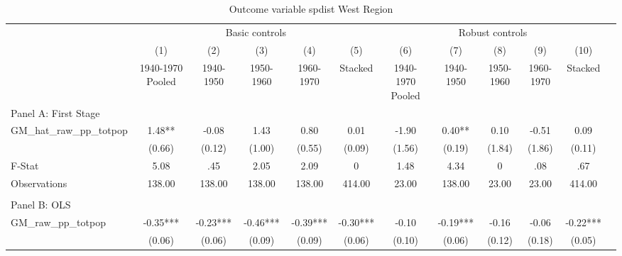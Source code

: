  \begin{table}[htbp]\centering {} \begin{threeparttable} \caption{Outcome variable spdist West Region} \begin{tabular}{l*{11}{c}} \toprule
          &\multicolumn{5}{c}{Basic controls}                                   &\multicolumn{5}{c}{Robust controls}                                  \\\cmidrule(lr){2-6}\cmidrule(lr){7-11}
          &\multicolumn{1}{c}{(1)}&\multicolumn{1}{c}{(2)}&\multicolumn{1}{c}{(3)}&\multicolumn{1}{c}{(4)}&\multicolumn{1}{c}{(5)}&\multicolumn{1}{c}{(6)}&\multicolumn{1}{c}{(7)}&\multicolumn{1}{c}{(8)}&\multicolumn{1}{c}{(9)}&\multicolumn{1}{c}{(10)}\\
          &\multicolumn{1}{c}{1940-1970 Pooled}&\multicolumn{1}{c}{1940-1950}&\multicolumn{1}{c}{1950-1960}&\multicolumn{1}{c}{1960-1970}&\multicolumn{1}{c}{Stacked}&\multicolumn{1}{c}{1940-1970 Pooled}&\multicolumn{1}{c}{1940-1950}&\multicolumn{1}{c}{1950-1960}&\multicolumn{1}{c}{1960-1970}&\multicolumn{1}{c}{Stacked}\\
\cmidrule(lr){1-11}
\multicolumn{10}{l}{Panel A: First Stage}\\
\cmidrule(lr){1-11}
GM\_hat\_raw\_pp\_totpop&      1.48** &     -0.08   &      1.43   &      0.80   &      0.01   &     -1.90   &      0.40** &      0.10   &     -0.51   &      0.09   \\
          &    (0.66)   &    (0.12)   &    (1.00)   &    (0.55)   &    (0.09)   &    (1.56)   &    (0.19)   &    (1.84)   &    (1.86)   &    (0.11)   \\
\midrule
F-Stat    &      5.08   &       .45   &      2.05   &      2.09   &         0   &      1.48   &      4.34   &         0   &       .08   &       .67   \\
Observations&    138.00   &    138.00   &    138.00   &    138.00   &    414.00   &     23.00   &    138.00   &     23.00   &     23.00   &    414.00   \\
\cmidrule[\heavyrulewidth](lr){1-11} \\ \cmidrule[\heavyrulewidth](lr){1-11}
\multicolumn{10}{l}{Panel B: OLS}\\
\cmidrule(lr){1-11}
GM\_raw\_pp\_totpop&     -0.35***&     -0.23***&     -0.46***&     -0.39***&     -0.30***&     -0.10   &     -0.19***&     -0.16   &     -0.06   &     -0.22***\\
          &    (0.06)   &    (0.06)   &    (0.09)   &    (0.09)   &    (0.06)   &    (0.10)   &    (0.06)   &    (0.12)   &    (0.18)   &    (0.05)   \\

\end{tabular}
\end{threeparttable}
\end{table}
